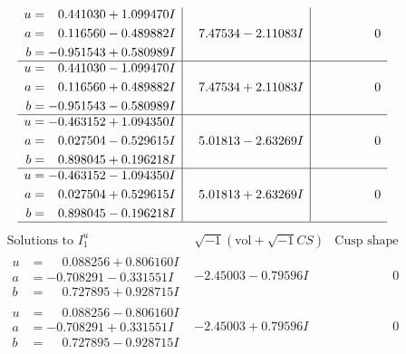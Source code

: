 \documentclass[1p]{elsarticle_modified}
\theoremstyle{definition}
\newcommand{\I}{\sqrt{-1}}
\begin{document}
$$\begin{array}{c|c|c}
\begin{aligned}
u &= \phantom{-}0.441030 + 1.099470 I \\
a &= \phantom{-}0.116560 - 0.489882 I \\
b &= -0.951543 + 0.580989 I\end{aligned}
 & \phantom{-}7.47534 - 2.11083 I & \phantom{-0.000000 } 0 \\ \hline\begin{aligned}
u &= \phantom{-}0.441030 - 1.099470 I \\
a &= \phantom{-}0.116560 + 0.489882 I \\
b &= -0.951543 - 0.580989 I\end{aligned}
 & \phantom{-}7.47534 + 2.11083 I & \phantom{-0.000000 } 0 \\ \hline\begin{aligned}
u &= -0.463152 + 1.094350 I \\
a &= \phantom{-}0.027504 - 0.529615 I \\
b &= \phantom{-}0.898045 + 0.196218 I\end{aligned}
 & \phantom{-}5.01813 - 2.63269 I & \phantom{-0.000000 } 0 \\ \hline\begin{aligned}
u &= -0.463152 - 1.094350 I \\
a &= \phantom{-}0.027504 + 0.529615 I \\
b &= \phantom{-}0.898045 - 0.196218 I\end{aligned}
 & \phantom{-}5.01813 + 2.63269 I & \phantom{-0.000000 } 0\\
 \hline 
 \end{array}$$\newpage$$\begin{array}{c|c|c}  
\text{Solutions to }I^u_{1}& \I (\text{vol} + \sqrt{-1}CS) & \text{Cusp shape}\\
 \hline 
\begin{aligned}
u &= \phantom{-}0.088256 + 0.806160 I \\
a &= -0.708291 - 0.331551 I \\
b &= \phantom{-}0.727895 + 0.928715 I\end{aligned}
 & -2.45003 - 0.79596 I & \phantom{-0.000000 } 0 \\ \hline\begin{aligned}
u &= \phantom{-}0.088256 - 0.806160 I \\
a &= -0.708291 + 0.331551 I \\
b &= \phantom{-}0.727895 - 0.928715 I\end{aligned}
 & -2.45003 + 0.79596 I & \phantom{-0.000000 } 0 \\ \hline\begin{aligned}

\end{aligned}
\end{array}$$
\end{document}
